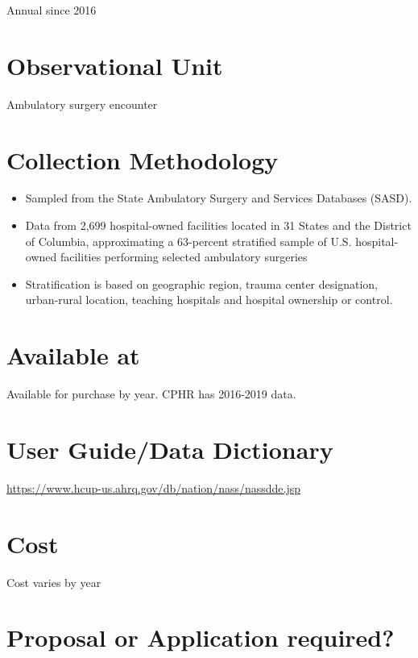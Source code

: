\documentclass[
]{book}
\providecommand{\tightlist}{%
  \setlength{\itemsep}{0pt}\setlength{\parskip}{0pt}}
\begin{document}
Annual since 2016

\hypertarget{observational-unit-68}{%
\section{Observational Unit}\label{observational-unit-68}}

Ambulatory surgery encounter

\hypertarget{collection-methodology-68}{%
\section{Collection Methodology}\label{collection-methodology-68}}

\begin{itemize}
\tightlist
\item
  Sampled from the State Ambulatory Surgery and Services Databases (SASD).
\item
  Data from 2,699 hospital-owned facilities located in 31 States and the District of Columbia, approximating a 63-percent stratified sample of U.S. hospital-owned facilities performing selected ambulatory surgeries
\item
  Stratification is based on geographic region, trauma center designation, urban-rural location, teaching hospitals and hospital ownership or control.
\end{itemize}

\hypertarget{available-at-68}{%
\section{Available at}\label{available-at-68}}

Available for purchase by year. CPHR has 2016-2019 data.

\hypertarget{user-guidedata-dictionary-68}{%
\section{User Guide/Data Dictionary}\label{user-guidedata-dictionary-68}}

\url{https://www.hcup-us.ahrq.gov/db/nation/nass/nassdde.jsp}

\hypertarget{cost-68}{%
\section{Cost}\label{cost-68}}

Cost varies by year

\hypertarget{proposal-or-application-required-68}{%
\section{Proposal or Application required?}\label{proposal-or-application-required-68}}
\end{document}
